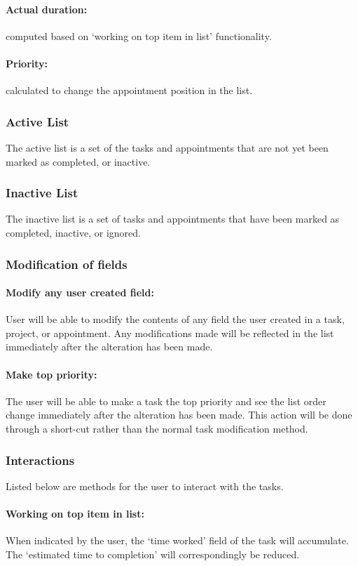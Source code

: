\documentclass[12pt,a4paper]{article}
\begin{document}
\paragraph{Actual duration:} computed based on `working on top item in list' functionality.
\paragraph{Priority:} calculated to change the appointment position in the list.

\subsubsection{Active List}
The active list is a set of the tasks and appointments that are not yet been marked as completed, or inactive.

\subsubsection{Inactive List}
The inactive list is a set of tasks and appointments that have been marked as completed, inactive, or ignored. 

\subsubsection{Modification of fields}
\paragraph{Modify any user created field:} User will be able to modify the contents of any field the user created in a task, project, or appointment.  Any modifications made will be reflected in the list immediately after the alteration has been made.
\paragraph{Make top priority:} The user will be able to make a task the top priority and see the list order change immediately after the alteration has been made.  This action will be done through a short-cut rather than the normal task modification method.

\subsubsection{Interactions}
Listed below are methods for the user to interact with the tasks.
\paragraph{Working on top item in list:} When indicated by the user, the `time worked' field of the task will accumulate. The `estimated time to completion' will correspondingly be reduced.
\end{document}
